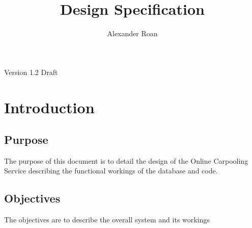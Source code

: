 \documentclass[11pt]{article}
\begin{document}
\begin{titlepage}
\title{Design Specification}
\author{Alexander Roan}
\maketitle
\begin{center}
Version 1.2 Draft
\end{center}
\end{titlepage}

\tableofcontents
\newpage
\section{Introduction}
\subsection{Purpose}
The purpose of this document is to detail the design of the Online Carpooling Service describing the functional workings of the database and code.

\subsection{Objectives}
The objectives are to describe the overall system and its workings
\end{document}
